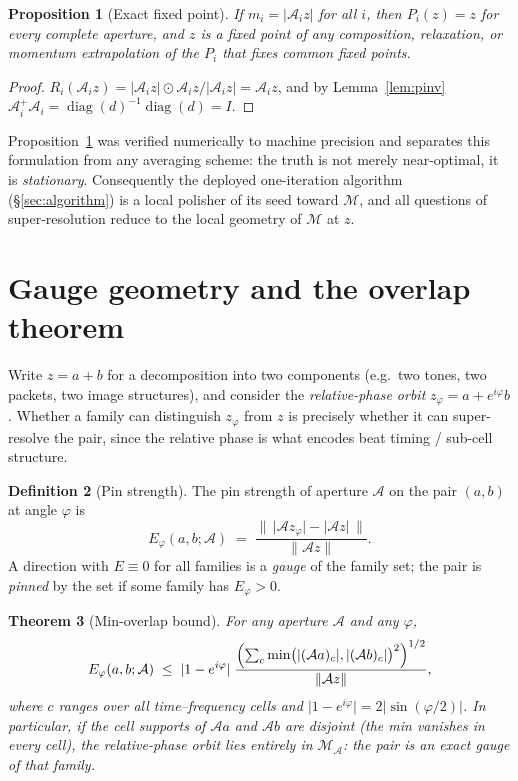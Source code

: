 \documentclass[11pt]{article}
\newtheorem{theorem}{Theorem}[section]
\newtheorem{proposition}[theorem]{Proposition}
\theoremstyle{definition}
\newtheorem{definition}[theorem]{Definition}
\newcommand{\cA}{\mathcal{A}}
\newcommand{\cM}{\mathcal{M}}
\newcommand{\norm}[1]{\lVert #1\rVert}
\newcommand{\abs}[1]{\lvert #1\rvert}
\newcommand{\diag}{\operatorname{diag}}
\begin{document}
\begin{proposition}[Exact fixed point]\label{prop:fixed}
If $m_{i}=\abs{\cA_{i}z}$ for all $i$, then $P_{i}(z)=z$ for every complete
aperture, and $z$ is a fixed point of any composition, relaxation, or
momentum extrapolation of the $P_{i}$ that fixes common fixed points.
\end{proposition}

\begin{proof}
$R_{i}(\cA_{i}z)=\abs{\cA_i z}\odot \cA_i z/\abs{\cA_i z}=\cA_{i}z$, and by
Lemma~\ref{lem:pinv} $\cA_{i}^{+}\cA_{i}=\diag(d)^{-1}\diag(d)=I$.
\end{proof}

Proposition~\ref{prop:fixed} was verified numerically to machine precision
and separates this formulation from any averaging scheme: the truth is not
merely near-optimal, it is \emph{stationary}.  Consequently the deployed
one-iteration algorithm (\S\ref{sec:algorithm}) is a local polisher of its
seed toward $\cM$, and all questions of super-resolution reduce to the local
geometry of $\cM$ at $z$.

\section{Gauge geometry and the overlap theorem}\label{sec:gauge}

Write $z=a+b$ for a decomposition into two components (e.g.\ two tones, two
packets, two image structures), and consider the \emph{relative-phase
orbit} $z_{\varphi}=a+e^{i\varphi}b$.  Whether a family can distinguish
$z_\varphi$ from $z$ is precisely whether it can super-resolve the pair,
since the relative phase is what encodes beat timing / sub-cell structure.

\begin{definition}[Pin strength]\label{def:pin}
The pin strength of aperture $\cA$ on the pair $(a,b)$ at angle $\varphi$
is
\[
  E_{\varphi}(a,b;\cA)\;=\;
  \frac{\bigl\lVert\,\abs{\cA z_{\varphi}}-\abs{\cA z}\,\bigr\rVert}
       {\norm{\cA z}} .
\]
A direction with $E\equiv0$ for all families is a \emph{gauge} of the
family set; the pair is \emph{pinned} by the set if some family has
$E_{\varphi}>0$.
\end{definition}

\begin{theorem}[Min-overlap bound]\label{thm:overlap}
For any aperture $\cA$ and any $\varphi$,
\[
  E_{\varphi}(a,b;\cA)\;\le\;
  \abs{1-e^{i\varphi}}\;
  \frac{\Bigl(\sum_{c}\min\bigl(\abs{(\cA a)_{c}},\abs{(\cA b)_{c}}\bigr)^{2}
        \Bigr)^{1/2}}
       {\norm{\cA z}},
\]
where $c$ ranges over all time--frequency cells and
$\abs{1-e^{i\varphi}}=2\abs{\sin(\varphi/2)}$.
In particular, if the cell supports of $\cA a$ and $\cA b$ are disjoint
(the min vanishes in every cell), the relative-phase orbit lies entirely in
$\cM_{\cA}$: the pair is an exact gauge of that family.
\end{theorem}
\end{document}
